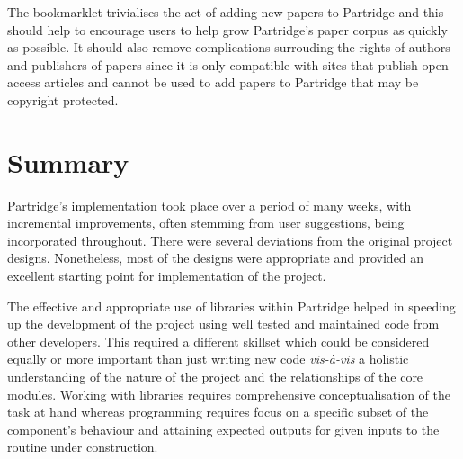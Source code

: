 The bookmarklet trivialises the act of adding new papers to Partridge and this
should help to encourage users to help grow Partridge's paper corpus as quickly
as possible. It should also remove complications surrouding the rights of authors and
publishers of papers since it is only compatible with sites that publish open
access articles and cannot be used to add papers to Partridge that may be
copyright protected.

\section{Summary}

Partridge's implementation took place over a period of many weeks, with
incremental improvements, often stemming from user suggestions, being
incorporated throughout. There were several deviations from the original
project designs. Nonetheless, most of the designs were appropriate and provided
an excellent starting point for implementation of the project.

The effective and appropriate use of libraries within Partridge helped in
speeding up the development of the project using well tested and maintained
code from other developers. This required a different skillset which could be
considered equally or more important than just writing new code
\emph{vis-à-vis} a holistic understanding of the nature of the project and the
relationships of the core modules. Working with libraries requires
comprehensive conceptualisation of the task at hand whereas programming
requires focus on a specific subset of the component's behaviour and attaining
expected outputs for given inputs to the routine under construction.

